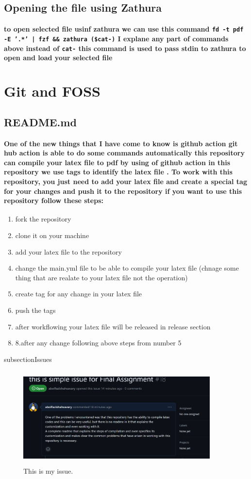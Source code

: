 \documentclass[12pt]{article}
\begin{document}
\subsection{Opening the file using Zathura}
\paragraph{to open selected file usinf zathura we can use this command \texttt{fd -t pdf -E '.*' | fzf \&\& zathura (\$cat-)}  I explane any part of commands above instead of \texttt{cat-} this command is used to pass stdin to zathura to open and load your selected file}
\section{Git and FOSS}
\subsection{README.md}
\paragraph{One of the new things that I have come to know is github action git hub action is able to do some commands automatically this repository can compile your latex file to pdf by using of github action in this repository we use tags to identify the latex file . To work with this repository, you just need to add your latex file and create a special tag for your changes and push it to the repository if you want to use this repository follow these steps:}
\begin{enumerate}
    \item fork the repository 
    \item clone it on your machine 
    \item add your latex file to the repository
    \item change the main.yml file to be able to compile your latex file (chnage some thing that are realate to your latex file not the operation) 
    \item create tag for any change in your latex file 
    \item push the tags 
    \item after workflowing your latex file will be released in release section 
    \item 8.after any change following above steps from number 5

\end{enumerate}
subsection{Issues}
\begin{figure}[b]
    \centerline{\includegraphics[width=4in, height=2in]{issue.png}}
    \caption{This is my issue.}
    \label{fig}
\end{figure}
\end{document}
